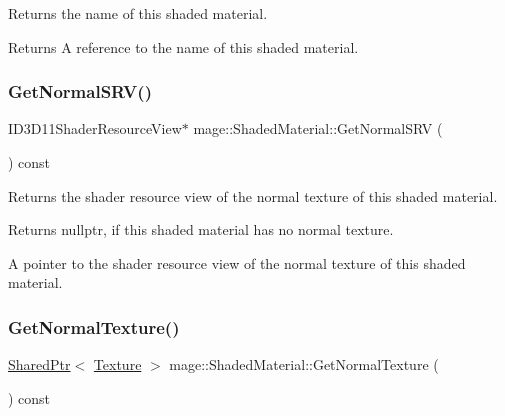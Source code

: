 Returns the name of this shaded material.

\begin{DoxyReturn}{Returns}
A reference to the name of this shaded material. 
\end{DoxyReturn}
\hypertarget{structmage_1_1_shaded_material_a5fd4dfbf132fa697fafbbac082ab8bdb}{}\label{structmage_1_1_shaded_material_a5fd4dfbf132fa697fafbbac082ab8bdb} 
\subsubsection{\texorpdfstring{Get\+Normal\+S\+R\+V()}{GetNormalSRV()}}
{\footnotesize\ttfamily I\+D3\+D11\+Shader\+Resource\+View$\ast$ mage\+::\+Shaded\+Material\+::\+Get\+Normal\+S\+RV (\begin{DoxyParamCaption}{ }\end{DoxyParamCaption}) const\hspace{0.3cm}{\ttfamily [noexcept]}}

Returns the shader resource view of the normal texture of this shaded material.

\begin{DoxyReturn}{Returns}
{\ttfamily nullptr}, if this shaded material has no normal texture. 

A pointer to the shader resource view of the normal texture of this shaded material. 
\end{DoxyReturn}
\hypertarget{structmage_1_1_shaded_material_a879b003bf09d4985c028d134cdbe46eb}{}\label{structmage_1_1_shaded_material_a879b003bf09d4985c028d134cdbe46eb} 
\subsubsection{\texorpdfstring{Get\+Normal\+Texture()}{GetNormalTexture()}}
{\footnotesize\ttfamily \hyperlink{namespacemage_a1e01ae66713838a7a67d30e44c67703e}{Shared\+Ptr}$<$ \hyperlink{classmage_1_1_texture}{Texture} $>$ mage\+::\+Shaded\+Material\+::\+Get\+Normal\+Texture (\begin{DoxyParamCaption}{ }\end{DoxyParamCaption}) const\hspace{0.3cm}{\ttfamily [noexcept]}}

